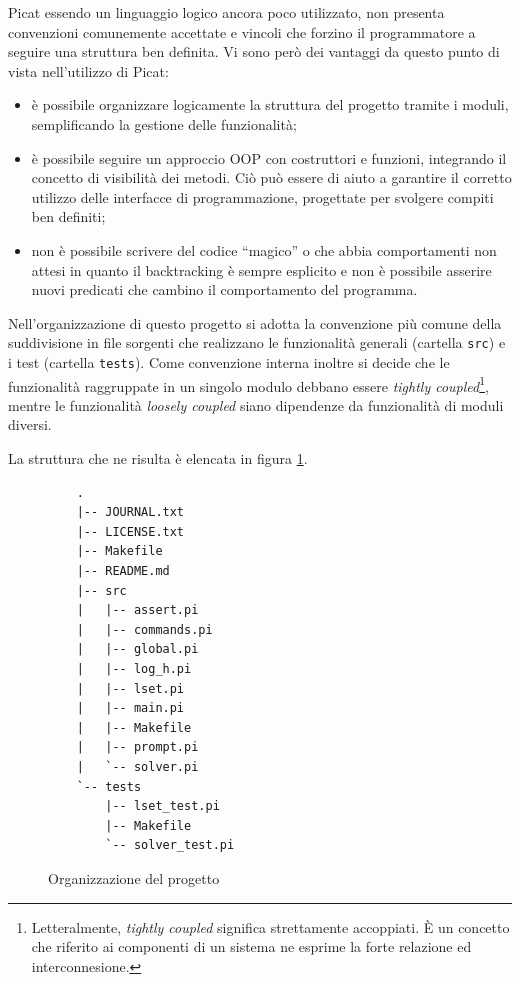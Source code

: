 \documentclass[12pt,a4paper,openright]{book}  %
\begin{document}
Picat essendo un linguaggio logico ancora poco utilizzato, non
presenta convenzioni comunemente accettate e vincoli che forzino il
programmatore a seguire una struttura ben definita. Vi sono però dei
vantaggi da questo punto di vista nell'utilizzo di Picat:
\begin{itemize}
	\item è possibile organizzare logicamente la struttura del
          progetto tramite i moduli, semplificando la gestione delle
          funzionalità;
	\item è possibile seguire un approccio OOP con costruttori e
          funzioni, integrando il concetto di visibilità dei
          metodi. Ciò può essere di aiuto a garantire il corretto
          utilizzo delle interfacce di programmazione, progettate per
          svolgere compiti ben definiti;
	\item non è possibile scrivere del codice ``magico'' o che
          abbia comportamenti non attesi in quanto il backtracking è
          sempre esplicito e non è possibile asserire nuovi predicati
          che cambino il comportamento del programma.
\end{itemize}

Nell'organizzazione di questo progetto si adotta la convenzione più
comune della suddivisione in file sorgenti che realizzano le
funzionalità generali (cartella \texttt{src}) e i test (cartella
\texttt{tests}). Come convenzione interna inoltre si decide che le
funzionalità raggruppate in un singolo modulo debbano essere
\textit{tightly coupled}\footnote{Letteralmente, \textit{tightly
    coupled} significa strettamente accoppiati. \`E un concetto che
  riferito ai componenti di un sistema ne esprime la forte relazione
  ed interconnesione.}, mentre le funzionalità \textit{loosely
  coupled} siano dipendenze da funzionalità di moduli diversi.

La struttura che ne risulta è elencata in figura
\ref{fig:proj_folder_structure}.

\begin{figure}[]
	\label{fig:proj_folder_structure}
	\begin{verbatim}
	.
	|-- JOURNAL.txt
	|-- LICENSE.txt
	|-- Makefile
	|-- README.md
	|-- src
	|   |-- assert.pi
	|   |-- commands.pi
	|   |-- global.pi
	|   |-- log_h.pi
	|   |-- lset.pi
	|   |-- main.pi
	|   |-- Makefile
	|   |-- prompt.pi
	|   `-- solver.pi
	`-- tests
	    |-- lset_test.pi
	    |-- Makefile
	    `-- solver_test.pi
	\end{verbatim}
	\caption{Organizzazione del progetto}
\end{figure}
\end{document}
